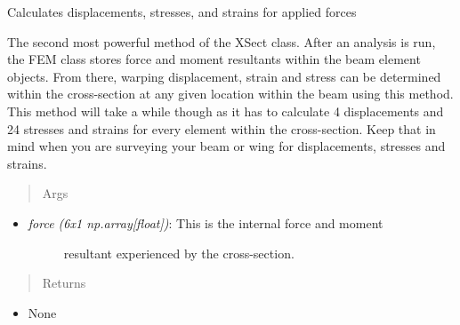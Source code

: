 \documentclass[letterpaper,10pt,english]{sphinxmanual}
\begin{document}
\begin{fulllineitems}
\begin{fulllineitems}
\begin{itemize}
\end{itemize}

\end{fulllineitems}


\begin{fulllineitems}
\label{structures:AeroComBAT.Structures.XSect.calcWarpEffects}
Calculates displacements, stresses, and strains for applied forces

The second most powerful method of the XSect class. After an analysis
is run, the FEM class stores force and moment resultants within the
beam element objects. From there, warping displacement, strain and
stress can be determined within the cross-section at any given location
within the beam using this method. This method will take a while though
as it has to calculate 4 displacements and 24 stresses and strains for
every element within the cross-section. Keep that in mind when you are
surveying your beam or wing for displacements, stresses and strains.
\begin{quote}\begin{description}
\item[{Args}] \leavevmode
\end{description}\end{quote}
\begin{itemize}
\item {} \begin{description}
\item[{\emph{force (6x1 np.array{[}float{]})}: This is the internal force and moment}] \leavevmode
resultant experienced by the cross-section.

\end{description}

\end{itemize}
\begin{quote}\begin{description}
\item[{Returns}] \leavevmode
\end{description}\end{quote}
\begin{itemize}
\item {} 
None

\end{itemize}

\end{fulllineitems}


\end{fulllineitems}
\end{document}

